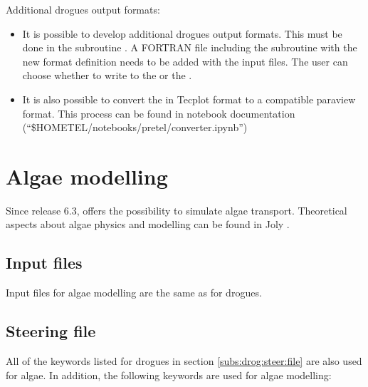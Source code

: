 \begin{WarningBlock}{Additional drogues output formats:}
\begin{itemize}
\item It is possible to develop additional drogues output formats.
This must be done in the subroutine .
A FORTRAN file including the subroutine  with the new
format definition needs to be added with the input files.
The user can choose whether to write to the 
or the .
\item It is also possible to convert the  in Tecplot
  format to a compatible paraview format.
  This process can be found in notebook documentation
  (``\$HOMETEL/notebooks/pretel/converter.ipynb'')
\end{itemize}
\end{WarningBlock}

\section{Algae modelling}
\label{sec:algae:bloom}
Since release 6.3,  offers the possibility to simulate algae
transport.
Theoretical aspects about algae physics and modelling can be found
in Joly \cite{Joly2011}.


\subsection{Input files}

Input files for algae modelling are the same as for drogues.


\subsection{Steering file}

All of the keywords listed for drogues in section \ref{subs:drog:steer:file}
are also used for algae.
In addition, the following keywords are used for algae modelling:

